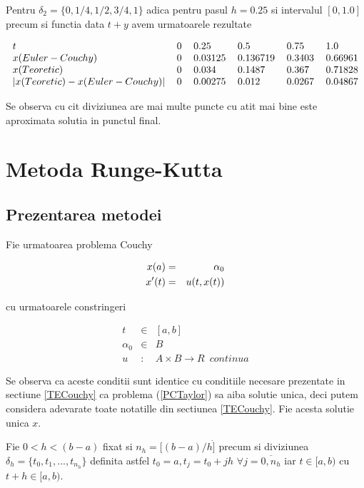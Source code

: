\documentclass[a4paper,twoside]{book}
\begin{document}
Pentru $\delta _{2}=\{0,1/4,1/2,3/4,1\}$ adica pentru pasul $h=0.25$ si
intervalul $[0,1.0]$ precum si functia data $t+y$ avem urmatoarele rezultate

\begin{equation*}
\begin{tabular}{llllll}
$t$ & 0 & 0.25 & 0.5 & 0.75 & 1.0 \\ 
$x(Euler-Couchy)$ & 0 & 0.03125 & 0.136719 & 0.3403 & 0.66961 \\ 
$x(Teoretic)$ & 0 & 0.034 & 0.1487 & 0.367 & 0.71828 \\ 
$\left\vert x(Teoretic)-x(Euler-Couchy)\right\vert $ & 0 & 0.00275 & 0.012 & 
0.0267 & 0.04867%
\end{tabular}%
\end{equation*}

Se observa cu cit diviziunea are mai multe puncte cu atit mai bine este
aproximata solutia in punctul final.

\chapter{Metoda Runge-Kutta}

\section{Prezentarea metodei}

Fie urmatoarea problema Couchy

\begin{eqnarray}
x(a) &=&\alpha _{0}  \label{PCouchyRK} \\
x^{\prime }(t) &=&u(t,x(t))  \notag
\end{eqnarray}

cu urmatoarele constringeri

\begin{eqnarray*}
t &\in &[a,b] \\
\alpha _{0} &\in &B \\
u &:&A\times B\rightarrow R\,\,\,continua
\end{eqnarray*}

Se observa ca aceste conditii sunt identice cu conditiile necesare
prezentate in sectiune \ref{TECouchy} ca problema (\ref{PCTaylor}) sa aiba
solutie unica, deci putem considera adevarate toate notatille din sectiunea %
\ref{TECouchy}. Fie acesta solutie unica $x$.

Fie $0<h<(b-a)$ fixat si $n_{h}=[(b-a)/h\dot{]}$ precum si diviziunea $%
\delta _{h}=\{t_{0},t_{1},...,t_{n_{h}}\}$ definita astfel $%
t_{0}=a,t_{j}=t_{0}+jh$ $\forall j=\overline{0,n_{h}}$ iar $t\in \lbrack
a,b) $ cu $t+h\in \lbrack a,b)$.
\end{document}
